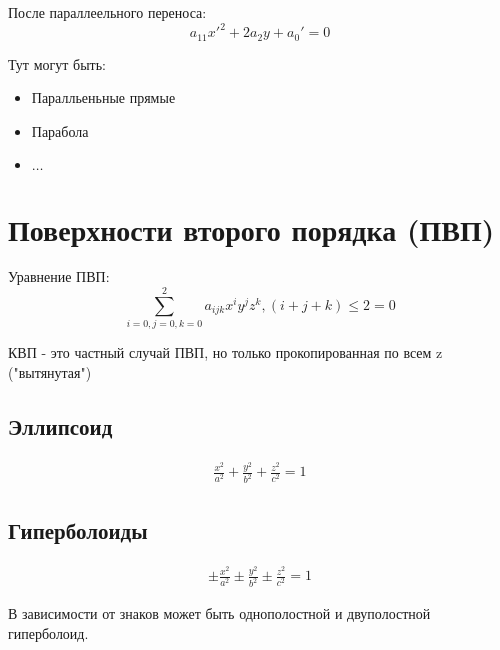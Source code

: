 \documentclass[12pt, a4paper]{article}
\begin{document}
    После параллеельного переноса:
    \begin{equation}
        a_{11} x'^2 + 2a_2 y + a_0' = 0
    \end{equation}

    Тут могут быть:
    \begin{itemize}
        \item Паралльеньные прямые
        \item Парабола
        \item $\dots$
    \end{itemize}

    \section{Поверхности второго порядка (ПВП)}

    Уравнение ПВП:
    \begin{equation}
        \sum_{i = 0, j = 0, k = 0}^{2} a_{ijk} x^i y^j z^k, (i + j + k) \leqslant 2 = 0
    \end{equation}

    \begin{note}
        КВП - это частный случай ПВП, но только прокопированная по всем z ("вытянутая")
    \end{note}

    \subsection{Эллипсоид}

    \begin{eqnarray}
        \frac{x^2}{a^2} + \frac{y^2}{b^2} + \frac{z^2}{c^2} = 1
    \end{eqnarray}

    \subsection{Гиперболоиды}

    \begin{eqnarray}
        \pm \frac{x^2}{a^2} \pm  \frac{y^2}{b^2} \pm  \frac{z^2}{c^2} = 1
    \end{eqnarray}

    В зависимости от знаков может быть однополостной и двуполостной гиперболоид.
\end{document}
